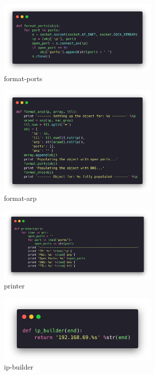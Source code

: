 \begin{figure}[H]
  \centering
  \includegraphics[width=0.7\textwidth]{figures/code/format-ports}
  \caption{format-ports}
  \label{f:format-ports}
\end{figure}

\begin{figure}[H]
  \centering
  \includegraphics[width=0.7\textwidth]{figures/code/format-arp}
  \caption{format-arp}
  \label{f:format-arp}
\end{figure}

\begin{figure}[H]
  \centering
  \includegraphics[width=0.7\textwidth]{figures/code/printer}
  \caption{printer}
  \label{f:printer}
\end{figure}

\begin{figure}[H]
  \centering
  \includegraphics[width=0.7\textwidth]{figures/code/ip-builder}
  \caption{ip-builder}
  \label{f:ip-builder}
\end{figure}

